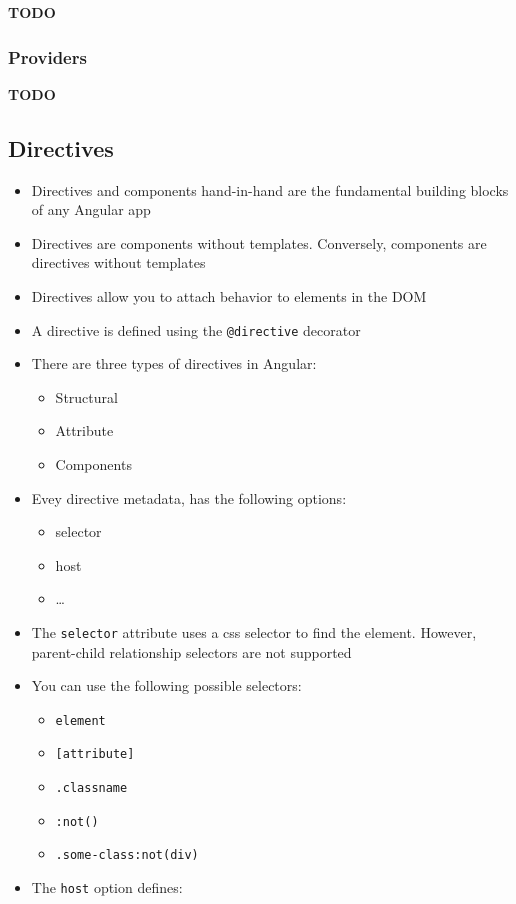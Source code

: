 \documentclass[12pt,]{article}
\providecommand{\tightlist}{%
  \setlength{\itemsep}{0pt}\setlength{\parskip}{0pt}}
\begin{document}
\textbf{TODO}

\subsubsection{Providers}\label{providers}

\textbf{TODO}

\subsection{Directives}\label{directives}

\begin{itemize}
\tightlist
\item
  Directives and components hand-in-hand are the fundamental building
  blocks of any Angular app
\item
  Directives are components without templates. Conversely, components
  are directives without templates
\item
  Directives allow you to attach behavior to elements in the DOM
\item
  A directive is defined using the \texttt{@directive} decorator
\item
  There are three types of directives in Angular:

  \begin{itemize}
  \tightlist
  \item
    Structural
  \item
    Attribute
  \item
    Components
  \end{itemize}
\item
  Evey directive metadata, has the following options:

  \begin{itemize}
  \tightlist
  \item
    selector
  \item
    host
  \item
    \ldots{}
  \end{itemize}
\item
  The \texttt{selector} attribute uses a css selector to find the
  element. However, parent-child relationship selectors are not
  supported
\item
  You can use the following possible selectors:

  \begin{itemize}
  \tightlist
  \item
    \texttt{element}
  \item
    \texttt{{[}attribute{]}}
  \item
    \texttt{.classname}
  \item
    \texttt{:not()}
  \item
    \texttt{.some-class:not(div)}
  \end{itemize}
\item
  The \texttt{host} option defines:


\end{itemize}
\end{document}
